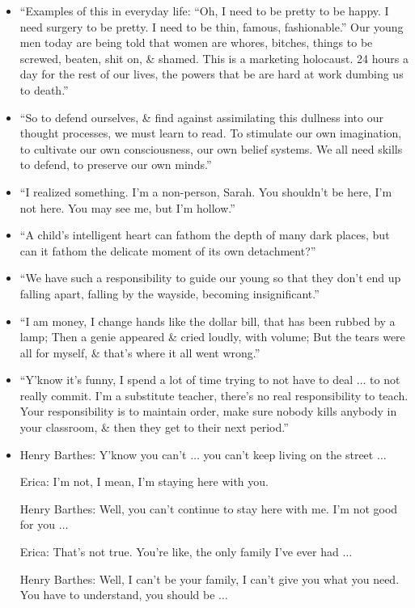 \documentclass{article}
\begin{document}
\begin{enumerate}
\begin{itemize}
	    It's deliberately believing in lies while knowing they're false.
		\item ``Examples of this in everyday life: ``Oh, I need to be pretty to be happy. I need surgery to be pretty. I need to be thin, famous, fashionable.'' Our young men today are being told that women are whores, bitches, things to be screwed, beaten, shit on, \& shamed. This is a marketing holocaust. 24 hours a day for the rest of our lives, the powers that be are hard at work dumbing us to death.''
		\item ``So to defend ourselves, \& find against assimilating this dullness into our thought processes, we must learn to read. To stimulate our own imagination, to cultivate our own consciousness, our own belief systems. We all need skills to defend, to preserve our own minds.''
		\item ``I realized something. I'm a non-person, Sarah. You shouldn't be here, I'm not here. You may see me, but I'm hollow.''
		\item ``A child's intelligent heart can fathom the depth of many dark places, but can it fathom the delicate moment of its own detachment?''
		\item ``We have such a responsibility to guide our young so that they don't end up falling apart, falling by the wayside, becoming insignificant.''
		\item ``I am money, I change hands like the dollar bill, that has been rubbed by a lamp; Then a genie appeared \& cried loudly, with volume; But the tears were all for myself, \& that's where it all went wrong.''
		\item ``Y'know it's funny, I spend a lot of time trying to not have to deal $\ldots$ to not really commit. I'm a substitute teacher, there's no real responsibility to teach. Your responsibility is to maintain order, make sure nobody kills anybody in your classroom, \& then they get to their next period.''
		\item Henry Barthes: Y'know you can't $\ldots$ you can't keep living on the street $\ldots$

		Erica: I'm not, I mean, I'm staying here with you.

		Henry Barthes: Well, you can't continue to stay here with me. I'm not good for you $\ldots$

		Erica: That's not true. You're like, the only family I've ever had $\ldots$

		Henry Barthes: Well, I can't be your family, I can't give you what you need. You have to understand, you should be $\ldots$


\end{itemize}
\end{enumerate}
\end{document}
